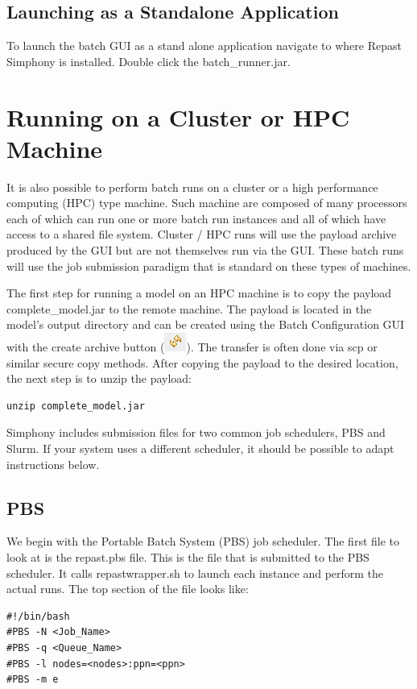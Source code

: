 \documentclass[11pt]{amsart}
\begin{document}
\subsection{Launching as a Standalone Application}
To launch the batch GUI as a stand alone application navigate to where Repast Simphony is installed. Double click the batch\_runner.jar.

\section{Running on a Cluster or HPC Machine}
\label{sec:hpc}

It is also possible to perform batch runs on a cluster or a high performance computing (HPC) type machine. Such machine are composed of many processors each of which can run one or more batch run instances and all of which have access to a shared file system. Cluster / HPC runs will use the payload archive produced by the GUI  but are not themselves run via the GUI. These batch runs will use the job submission paradigm that is standard on these types of machines.

The first step for running a model on an HPC machine is to copy the payload complete\_model.jar to the remote machine. The payload is located in the model's output directory and can be created using the Batch Configuration GUI with the create archive button (\includegraphics[height=.2in]{images/create_archive_button.png}). The transfer is often done via scp or similar secure copy methods. After copying the payload to the desired location, the next step is to unzip the payload:

\begin{verbatim}
unzip complete_model.jar
\end{verbatim}

Simphony includes submission files for two common job schedulers, PBS and Slurm. If your system uses a different scheduler, it should be possible to adapt instructions below. 

\subsection{PBS}
We begin with the Portable Batch System (PBS) job scheduler. The first file to look at is the repast.pbs file. This is the file that is submitted to the PBS scheduler. It calls repastwrapper.sh to launch each instance and perform the actual runs. The top section of the file looks like:
\begin{verbatim}
#!/bin/bash
#PBS -N <Job_Name>
#PBS -q <Queue_Name>
#PBS -l nodes=<nodes>:ppn=<ppn>
#PBS -m e
\end{verbatim}
\end{document}
